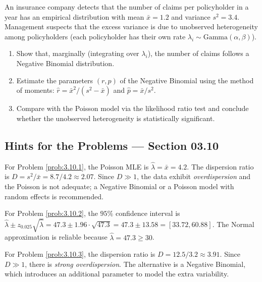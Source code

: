 \begin{problema}
	\label{prob:3.10.10}
	An insurance company detects that the number of claims per policyholder in a year has an empirical distribution with mean $\bar{x} = 1.2$ and variance $s^{2} = 3.4$. Management suspects that the excess variance is due to unobserved heterogeneity among policyholders (each policyholder has their own rate $\lambda_{i} \sim \text{Gamma}(\alpha, \beta)$).
	\begin{enumerate}
		\item Show that, marginally (integrating over $\lambda_{i}$), the number of claims follows a Negative Binomial distribution.
		\item Estimate the parameters $(r, p)$ of the Negative Binomial using the method of moments: $\hat{r} = \bar{x}^{2}/(s^{2} - \bar{x})$ and $\hat{p} = \bar{x}/s^{2}$.
		\item Compare with the Poisson model via the likelihood ratio test and conclude whether the unobserved heterogeneity is statistically significant.
	\end{enumerate}
\end{problema}

\subsection*{Hints for the Problems --- Section 03.10}

\begin{sugerencia}
	\label{sug:3.10.1}
	For Problem \ref{prob:3.10.1}, the Poisson MLE is $\hat{\lambda} = \bar{x} = 4.2$. The dispersion ratio is $D = s^{2}/\bar{x} = 8.7/4.2 \approx 2.07$. Since $D \gg 1$, the data exhibit \emph{overdispersion} and the Poisson is not adequate; a Negative Binomial or a Poisson model with random effects is recommended.
\end{sugerencia}

\begin{sugerencia}
	\label{sug:3.10.2}
	For Problem \ref{prob:3.10.2}, the $95\%$ confidence interval is $\hat{\lambda} \pm z_{0.025}\sqrt{\hat{\lambda}} = 47.3 \pm 1.96 \cdot \sqrt{47.3} = 47.3 \pm 13.58 = [33.72, 60.88]$. The Normal approximation is reliable because $\hat{\lambda} = 47.3 \ge 30$.
\end{sugerencia}

\begin{sugerencia}
	\label{sug:3.10.3}
	For Problem \ref{prob:3.10.3}, the dispersion ratio is $D = 12.5/3.2 \approx 3.91$. Since $D \gg 1$, there is \emph{strong overdispersion}. The alternative is a Negative Binomial, which introduces an additional parameter to model the extra variability.
\end{sugerencia}

